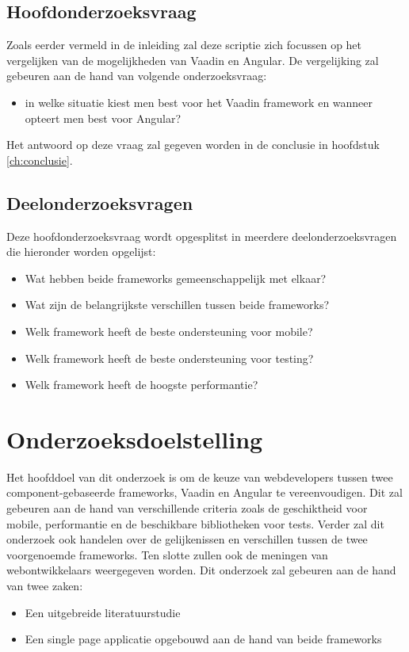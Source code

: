 \subsection{Hoofdonderzoeksvraag}
Zoals eerder vermeld in de inleiding zal deze scriptie zich focussen op het vergelijken van de mogelijkheden van Vaadin en Angular. De vergelijking zal gebeuren aan de hand van volgende onderzoeksvraag:
\begin{itemize}
	\item in welke situatie kiest men best voor het Vaadin framework en wanneer opteert men best voor Angular?
\end{itemize}
Het antwoord op deze vraag zal gegeven worden in de conclusie in hoofdstuk \ref*{ch:conclusie}.

\subsection{Deelonderzoeksvragen}
Deze hoofdonderzoeksvraag wordt opgesplitst in meerdere deelonderzoeksvragen die hieronder worden opgelijst:
\begin{itemize}
	\item Wat hebben beide frameworks gemeenschappelijk met elkaar?
	\item Wat zijn de belangrijkste verschillen tussen beide frameworks?
	\item Welk framework heeft de beste ondersteuning voor mobile?
	\item Welk framework heeft de beste ondersteuning voor testing?
	\item Welk framework heeft de hoogste performantie?

\end{itemize}

\section{Onderzoeksdoelstelling}
\label{sec:onderzoeksdoelstelling}

Het hoofddoel van dit onderzoek is om de keuze van webdevelopers tussen twee component-gebaseerde frameworks, Vaadin en Angular te vereenvoudigen. 
Dit zal gebeuren aan de hand van verschillende criteria zoals de geschiktheid voor mobile, performantie en de beschikbare bibliotheken voor tests. Verder zal dit onderzoek ook handelen over de gelijkenissen en verschillen tussen de twee voorgenoemde frameworks. 
Ten slotte zullen ook de meningen van webontwikkelaars weergegeven worden.
Dit onderzoek zal gebeuren aan de hand van twee zaken:
\begin{itemize}
	\item Een uitgebreide literatuurstudie
	\item Een single page applicatie opgebouwd aan de hand van beide frameworks
	
\end{itemize}

